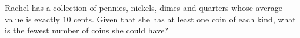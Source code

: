 Rachel has a collection of pennies, nickels, dimes and quarters whose average value is exactly $10$ cents. Given that she has at least one coin of each kind, what is the fewest number of coins she could have?
